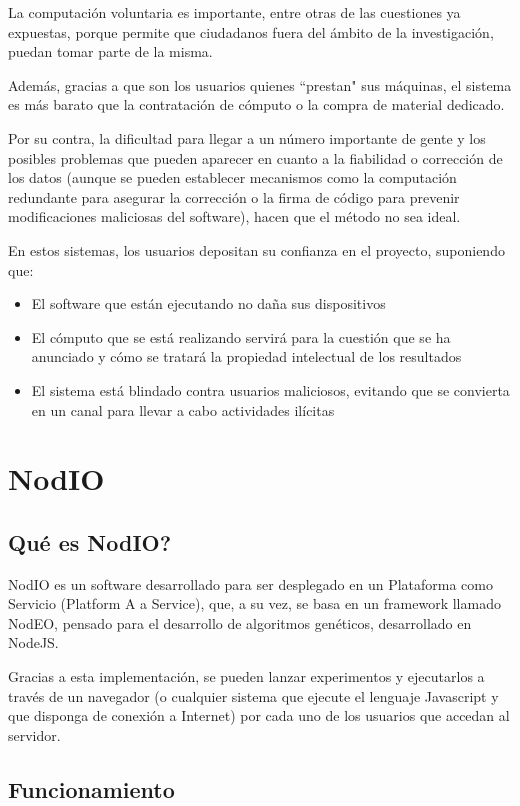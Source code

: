 \documentclass[runningheads,a4paper]{llncs}
\begin{document}
La computaci\'on voluntaria es importante, entre otras de las cuestiones ya expuestas,
porque permite que ciudadanos fuera del \'ambito de la investigaci\'on, puedan
tomar parte de la misma.

Adem\'as, gracias a que son los usuarios quienes ``prestan" sus m\'aquinas, el sistema
es m\'as barato que la contrataci\'on de c\'omputo o la compra de material dedicado.

Por su contra, la dificultad para llegar a un n\'umero importante de gente y los posibles
problemas que pueden aparecer en cuanto a la fiabilidad o correcci\'on de los datos
(aunque se pueden establecer mecanismos como la computaci\'on redundante
para asegurar la correcci\'on o la firma de c\'odigo para prevenir modificaciones maliciosas
del software), hacen que el m\'etodo no sea ideal.

En estos sistemas, los usuarios depositan su confianza en el proyecto, suponiendo que:
\begin{itemize}
  \item El software que est\'an ejecutando no da\~na sus dispositivos
  \item El c\'omputo que se est\'a realizando servir\'a para la cuesti\'on que se
  ha anunciado y c\'omo se tratar\'a la propiedad intelectual de los resultados
  \item El sistema est\'a blindado contra usuarios maliciosos, evitando que
  se convierta en un canal para llevar a cabo actividades il\'icitas
\end{itemize}

\section{NodIO}
\subsection{\textquestiondown	Qu\'e es NodIO?}
NodIO \cite{nodio} es un software desarrollado para ser desplegado en un
Plataforma como Servicio (Platform A a Service), que, a su vez, se basa en un
framework llamado NodEO, pensado para el desarrollo de algoritmos gen\'eticos,
desarrollado en NodeJS.

Gracias a esta implementaci\'on, se pueden lanzar experimentos y ejecutarlos a
trav\'es de un navegador (o cualquier sistema que ejecute el lenguaje Javascript
y que disponga de conexi\'on a Internet)
por cada uno de los usuarios que accedan al servidor.


\subsection{Funcionamiento}
\end{document}

